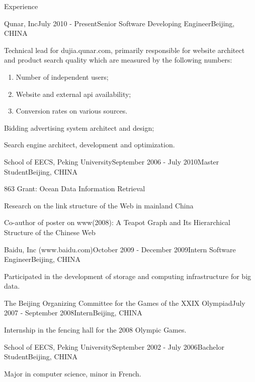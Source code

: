 \documentclass{resume} %
\begin{document}
\begin{rSection}{Experience}

\begin{rSubsection}{Qunar, Inc}{July 2010 - Present}{Senior Software Developing Engineer}{Beijing, CHINA}
\item Technical lead for dujia.qunar.com, primarily responsible for website architect and product search quality which are measured by the following numbers:
  \begin{enumerate}
    \item Number of independent users;
    \item Website and external api availability;
    \item Conversion rates on various sources.
  \end{enumerate}
\item Bidding advertising system architect and design;
\item Search engine architect, development and optimization.
\end{rSubsection}


\begin{rSubsection}{School of EECS, Peking University}{September 2006 - July 2010}{Master Student}{Beijing, CHINA}
\item 863 Grant: Ocean Data Information Retrieval
\item Research on the link structure of the Web in mainland China
\item Co-author of poster on www(2008): A Teapot Graph and Its Hierarchical Structure of the Chinese Web
\end{rSubsection}


\begin{rSubsection}{Baidu, Inc (www.baidu.com)}{October 2009 - December 2009}{Intern Software Engineer}{Beijing, CHINA}
\item Participated in the development of storage and computing infrastructure for big data.
\end{rSubsection}

\begin{rSubsection}{The Beijing Organizing Committee for the Games of the XXIX Olympiad}{July 2007 - September 2008}{Intern}{Beijing, CHINA}
\item Internship in the fencing hall for the 2008 Olympic Games.
\end{rSubsection}


\begin{rSubsection}{School of EECS, Peking University}{September 2002 - July 2006}{Bachelor Student}{Beijing, CHINA}
\item Major in computer science, minor in French.
\end{rSubsection}


\end{rSection}
\end{document}

